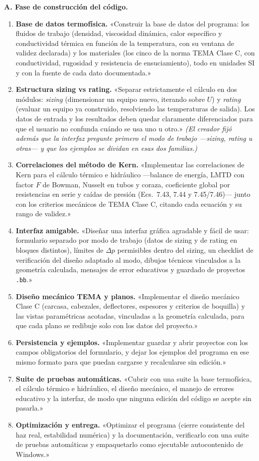 \documentclass[11pt,a4paper]{article}
\begin{document}
\textbf{A. Fase de construcción del código.}
\begin{enumerate}
\item \textbf{Base de datos termofísica.} «Construir la base de datos del
programa: los fluidos de trabajo (densidad, viscosidad dinámica, calor
específico y conductividad térmica en función de la temperatura, con su
ventana de validez declarada) y los materiales (los cinco de la norma TEMA
Clase C, con conductividad, rugosidad y resistencia de ensuciamiento), todo
en unidades SI y con la fuente de cada dato documentada.»
\item \textbf{Estructura sizing vs rating.} «Separar estrictamente el
cálculo en dos módulos: \emph{sizing} (dimensionar un equipo nuevo,
iterando sobre $U$) y \emph{rating} (evaluar un equipo ya construido,
resolviendo las temperaturas de salida). Los datos de entrada y los
resultados deben quedar claramente diferenciados para que el usuario no
confunda cuándo se usa uno u otro.» \emph{(El creador fijó además que
la interfaz pregunte primero el modo de trabajo ---sizing, rating u otras---
y que los ejemplos se dividan en esas dos familias.)}
\item \textbf{Correlaciones del método de Kern.} «Implementar las
correlaciones de Kern para el cálculo térmico e hidráulico ---balance
de energía, LMTD con factor $F$ de Bowman, Nusselt en tubos y coraza,
coeficiente global por resistencias en serie y caídas de presión
(Ecs.~7.43, 7.44 y 7.45/7.46)--- junto con los criterios mecánicos de TEMA
Clase C, citando cada ecuación y su rango de validez.»
\item \textbf{Interfaz amigable.} «Diseñar una interfaz gráfica agradable
y fácil de usar: formulario separado por modo de trabajo (datos de sizing y
de rating en bloques distintos), límites de $\Delta p$ permisibles dentro
del sizing, un checklist de verificación del diseño adaptado al modo,
dibujos técnicos vinculados a la geometría calculada, mensajes de error
educativos y guardado de proyectos \texttt{.bb}.»
\item \textbf{Diseño mecánico TEMA y planos.} «Implementar el diseño
mecánico Clase C (carcasa, cabezales, deflectores, espesores y criterios de
boquilla) y las vistas paramétricas acotadas, vinculadas a la geometría
calculada, para que cada plano se redibuje solo con los datos del
proyecto.»
\item \textbf{Persistencia y ejemplos.} «Implementar guardar y abrir
proyectos con los campos obligatorios del formulario, y dejar los ejemplos
del programa en ese mismo formato para que puedan cargarse y recalcularse
sin edición.»
\item \textbf{Suite de pruebas automáticas.} «Cubrir con una suite la base
termofísica, el cálculo térmico e hidráulico, el diseño mecánico, el manejo
de errores educativo y la interfaz, de modo que ninguna edición del código
se acepte sin pasarla.»
\item \textbf{Optimización y entrega.} «Optimizar el programa (cierre
consistente del haz real, estabilidad numérica) y la documentación,
verificarlo con una suite de pruebas automáticas y empaquetarlo como
ejecutable autocontenido de Windows.»
\end{enumerate}
\end{document}
